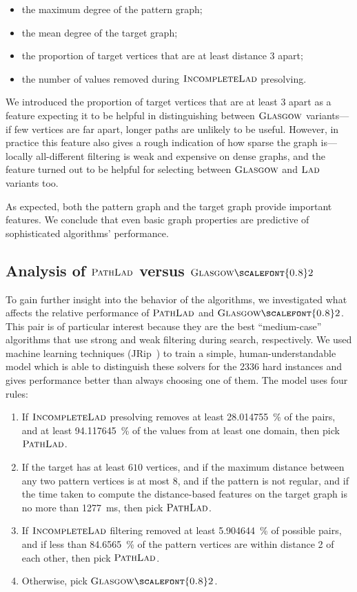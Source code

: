\documentclass{llncs}
\newcommand{\Glasgow}{$\textsc{Glasgow}$\xspace}
\newcommand{\LAD}{$\textsc{Lad}$\xspace}
\newcommand{\IncompleteLAD}{$\textsc{IncompleteLad}$\xspace}
\newcommand{\PathLAD}{$\textsc{PathLad}$\xspace}
\newcommand{\GlasgowTwo}{$\textsc{Glasgow{\scalefont{0.8}2}}$\xspace}
\begin{document}
\begin{itemize}
    \item the maximum degree of the pattern graph;
    \item the mean degree of the target graph;
    \item the proportion of target vertices that are at least distance 3
        apart;
    \item the number of values removed during \IncompleteLAD presolving.
\end{itemize}

\noindent
We introduced the proportion of target vertices that are at least 3 apart as a
feature expecting it to be helpful in distinguishing between
\Glasgow variants---if few vertices are far apart, longer paths are unlikely to
be useful. However, in practice this feature also gives a rough indication of
how sparse the graph is---locally all-different filtering is weak and expensive
on dense graphs, and the feature turned out to be helpful for selecting between
\Glasgow and \LAD variants too.

As expected, both the pattern graph and the target graph provide important
features. We conclude that even basic graph properties are predictive of
sophisticated algorithms' performance.

\subsection{Analysis of \PathLAD versus \GlasgowTwo}

To gain further insight into the behavior of the algorithms, we
investigated what affects the relative performance of \PathLAD and \GlasgowTwo.
This pair is of particular interest because they are the best ``medium-case''
algorithms that use strong and weak filtering during search, respectively. We
used machine learning techniques (JRip~\cite{Cohen1995}) to train a simple,
human-understandable model which is able to distinguish these solvers for the
2336 hard instances and gives performance better than always choosing one of
them. The model uses four rules:

\begin{enumerate}
    \item If \IncompleteLAD presolving removes at least
        \SI{28.014755}{\percent} of the pairs, and at least
        \SI{94.117645}{\percent} of the values from at least one domain, then
        pick \PathLAD.
    \item If the target has at least $610$ vertices, and if the maximum
        distance between any two pattern vertices is at most $8$, and if the
        pattern is not regular, and if the time taken to compute the
        distance-based features on the target graph is no more than
        \SI{1277}{\ms}, then pick \PathLAD.
    \item If \IncompleteLAD filtering removed at least \SI{5.904644}{\percent} of
        possible pairs, and if less than \SI{84.6565}{\percent} of the pattern
        vertices are within distance 2 of each other, then pick \PathLAD.
    \item Otherwise, pick \GlasgowTwo.
\end{enumerate}
\end{document}
